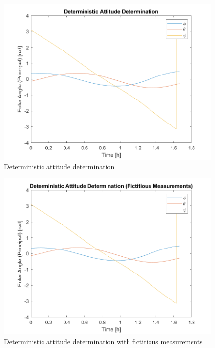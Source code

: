 \begin{figure}[H]
\centering
\includegraphics[scale=0.8]{Images/ps6_problem6_DAD.png}
\caption{Deterministic attitude determination}
\label{fig:Images/ps6_problem6_DAD}
\end{figure}

\begin{figure}[H]
\centering
\includegraphics[scale=0.8]{Images/ps6_problem6_DADFict.png}
\caption{Deterministic attitude determination with fictitious measurements}
\label{fig:Images/ps6_problem6_DADFict}
\end{figure}

